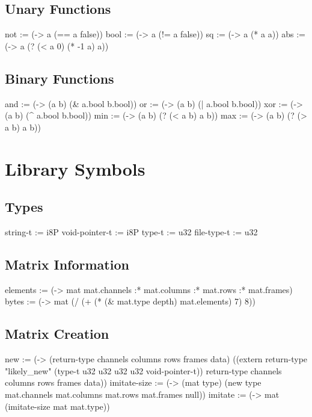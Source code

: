 \documentclass[numbers=noenddot]{scrbook}
\newenvironment{likely}
{ \verbatim }
{ \endverbatim }
\begin{document}
\section{Unary Functions}
\begin{likely}
not  := (-> a (== a false))
bool := (-> a (!= a false))
sq  := (-> a (* a a))
abs := (-> a (? (< a 0) (* -1 a) a))
\end{likely}

\section{Binary Functions}
\begin{likely}
and := (-> (a b) (& a.bool b.bool))
or  := (-> (a b) (| a.bool b.bool))
xor := (-> (a b) (^ a.bool b.bool))
min := (-> (a b) (? (< a b) a b))
max := (-> (a b) (? (> a b) a b))
\end{likely}

\chapter{Library Symbols}
\section{Types}
\begin{likely}
string-t       := i8P
void-pointer-t := i8P
type-t         := u32
file-type-t    := u32
\end{likely}

\section{Matrix Information}
\begin{likely}
elements := (-> mat mat.channels :* mat.columns :* mat.rows :* mat.frames)
bytes    := (-> mat (/ (+ (* (& mat.type depth) mat.elements) 7) 8))
\end{likely}

\section{Matrix Creation}
\begin{likely}
new := (-> (return-type channels columns rows frames data)
           ((extern return-type "likely_new" (type-t u32 u32 u32 u32 void-pointer-t)) return-type channels columns rows frames data))
imitate-size := (-> (mat type) (new type mat.channels mat.columns mat.rows mat.frames null))
imitate := (-> mat (imitate-size mat mat.type))
\end{likely}
\end{document}
